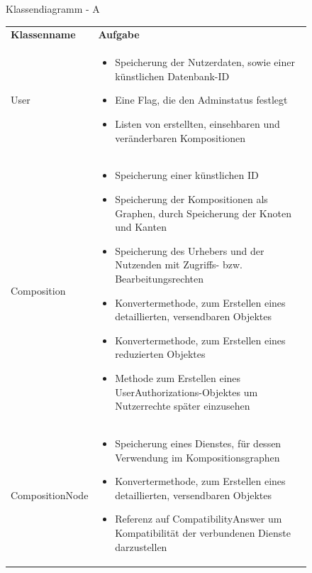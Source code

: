 \makeatletter
\newcommand*{\compress}{\@minipagetrue}
\makeatother

\begin{figure}[h]
	\centering
	\caption{Klassendiagramm - A}
	\label{fig:klassendiagramm-a}
\end{figure}

\begin{figure}[h]
	\centering
	\begin{tabularx}{\textwidth}{p{} | X}
		\rowcolor[HTML]{C0C0C0}
		\textbf{Klassenname} & \textbf{Aufgabe} \\
		User & \compress \begin{itemize}
			\item Speicherung der Nutzerdaten, sowie einer künstlichen Datenbank-ID
			\item Eine Flag, die den Adminstatus festlegt
			\item Listen von erstellten, einsehbaren und veränderbaren Kompositionen
		\end{itemize}\\
		\rowcolor[HTML]{E7E7E7}
		Composition & \compress \begin{itemize}
		  \item Speicherung einer künstlichen ID
			\item Speicherung der Kompositionen als Graphen, durch Speicherung der Knoten und Kanten
			\item Speicherung des Urhebers und der Nutzenden mit Zugriffs- bzw. Bearbeitungsrechten
			\item Konvertermethode, zum Erstellen eines detaillierten, versendbaren Objektes
			\item Konvertermethode, zum Erstellen eines reduzierten Objektes
			\item Methode zum Erstellen eines UserAuthorizations-Objektes um Nutzerrechte später einzusehen
		\end{itemize} \\
		CompositionNode & \compress \begin{itemize}
			\item Speicherung eines Dienstes, für dessen Verwendung im Kompositionsgraphen
			\item Konvertermethode, zum Erstellen eines detaillierten, versendbaren Objektes
			\item Referenz auf CompatibilityAnswer um Kompatibilität der verbundenen Dienste darzustellen
		\end{itemize} \\

\end{tabularx}
\end{figure}

